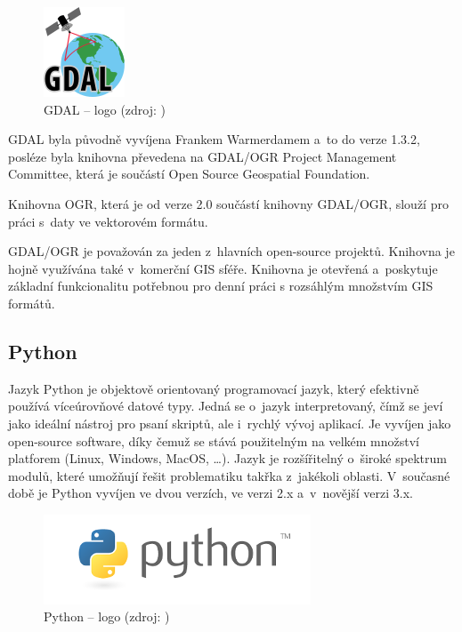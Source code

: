 \documentclass[12pt]{article}
\begin{document}
\begin{figure}[h]
\centering
\includegraphics[scale=1]{images/gdal-logo.png}
\caption[GDAL -- logo]{GDAL -- logo (zdroj: \cite{gdal})}
\end{figure}

GDAL byla původně vyvíjena Frankem Warmerdamem a~to do verze 1.3.2, posléze byla knihovna převedena na GDAL/OGR Project Management Committee, která je součástí Open Source Geospatial Foundation.\cite{gdal_wiki}

Knihovna OGR, která je od verze 2.0 součástí knihovny GDAL/OGR, slouží pro práci s~daty ve vektorovém formátu.\cite{gdal}

GDAL/OGR je považován za jeden z~hlavních open-source projektů. Knihovna je hojně využívána také v~komerční GIS sféře. Knihovna je otevřená a~poskytuje základní funkcionalitu potřebnou pro denní práci s rozsáhlým množstvím GIS formátů.\cite{gdal_wiki}


\subsection{Python}

Jazyk Python je objektově orientovaný programovací jazyk, který efektivně používá víceúrovňové datové typy. Jedná se o~jazyk interpretovaný, čímž se jeví jako ideální nástroj pro psaní skriptů, ale i~rychlý vývoj aplikací. Je vyvíjen jako open-source software, díky čemuž se stává použitelným na velkém množství platforem (Linux, Windows, MacOS, \dots). Jazyk je rozšířitelný o~široké spektrum modulů, které umožňují řešit problematiku takřka z~jakékoli oblasti. V~současné době je Python vyvíjen ve dvou verzích, ve verzi 2.x a~v~novější verzi 3.x.
\cite{dive_into_python}
\cite{python_web}

\begin{figure}[htb]
\centering
\includegraphics[scale=1]{images/python-logo.png}
\caption[Python -- logo]{Python -- logo (zdroj: \cite{python_web})}
\end{figure}
\end{document}

